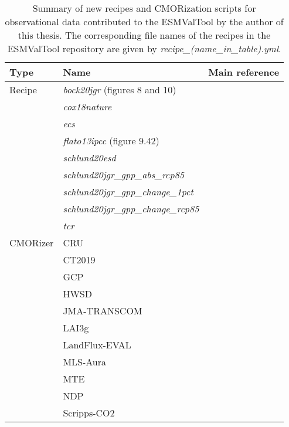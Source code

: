 \begin{table}[!b]
  \centering
  \begin{tabulary}{\columnwidth}{L L L}
    \toprule
    Type & Name & Main reference \\
    \midrule
    Recipe & \emph{bock20jgr} (figures 8 and 10) & \autocite{Bock2020} \\
    & \emph{cox18nature} & \autocite{Cox2018} \\
    & \emph{ecs} & \autocite{Gregory2004} \\
    & \emph{flato13ipcc} (figure 9.42) & \autocite{Flato2013} \\
    & \emph{schlund20esd} & \autocite{Schlund2020a} \\
    & \emph{schlund20jgr\_gpp\_abs\_rcp85} & \autocite{Schlund2020} \\
    & \emph{schlund20jgr\_gpp\_change\_1pct} & \autocite{Schlund2020} \\
    & \emph{schlund20jgr\_gpp\_change\_rcp85} & \autocite{Schlund2020} \\
    & \emph{tcr} & \autocite{Gregory2008} \\
    \midrule
    \ac{CMOR}izer & CRU & \autocite{Harris2014} \\
    & CT2019 & \autocite{Jacobson2020} \\
    & GCP & \autocite{Friedlingstein2020} \\
    & HWSD & \autocite{Wieder2014} \\
    & JMA-TRANSCOM & \autocite{Maki2010} \\
    & LAI3g & \autocite{Zhu2013} \\
    & LandFlux-EVAL & \autocite{Mueller2013} \\
    & MLS-Aura & \autocite{Read2015} \\
    & MTE & \autocite{Jung2011} \\
    & NDP & \autocite{Gibbs2006} \\
    & Scripps-\ac{CO2} & \autocite{Keeling2005} \\
    \bottomrule
  \end{tabulary}
  \caption{Summary of new recipes and \acs{CMOR}ization scripts for
    observational data contributed to the \acf{ESMValTool} by the author of
    this thesis. The corresponding file names of the recipes in the
    \acs{ESMValTool} repository are given by
    \emph{recipe\_(name\_in\_table).yml}.}
  \label{tab:03:changes_to_esmvaltool}
\end{table}

